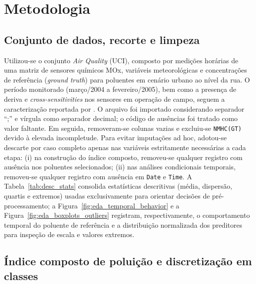 \section{Metodologia}
\label{sec:metodologia}

\subsection{Conjunto de dados, recorte e limpeza}
\label{subsec:dataset_limpeza}

Utilizou-se o conjunto \textit{Air Quality} (UCI), composto por medições horárias de uma matriz de sensores químicos MOx, variáveis meteorológicas e concentrações de referência (\textit{ground truth}) para poluentes em cenário urbano ao nível da rua. O período monitorado (março/2004 a fevereiro/2005), bem como a presença de deriva e \textit{cross-sensitivities} nos sensores em operação de campo, seguem a caracterização reportada por . O arquivo foi importado considerando separador ``;'' e vírgula como separador decimal; o código de ausências foi tratado como valor faltante. Em seguida, removeram-se colunas vazias e excluiu-se \texttt{NMHC(GT)} devido à elevada incompletude. Para evitar imputações ad hoc, adotou-se descarte por caso completo apenas nas variáveis estritamente necessárias a cada etapa: (i) na construção do índice composto, removeu-se qualquer registro com ausência nos poluentes selecionados; (ii) nas análises condicionais temporais, removeu-se qualquer registro com ausência em \texttt{Date} e \texttt{Time}. A Tabela~\ref{tab:desc_stats} consolida estatísticas descritivas (média, dispersão, quartis e extremos) usadas exclusivamente para orientar decisões de pré-processamento; a Figura~\ref{fig:eda_temporal_behavior} e a Figura~\ref{fig:eda_boxplots_outliers} registram, respectivamente, o comportamento temporal do poluente de referência e a distribuição normalizada dos preditores para inspeção de escala e valores extremos.

\subsection{Índice composto de poluição e discretização em classes}
\label{subsec:indice_classe}

